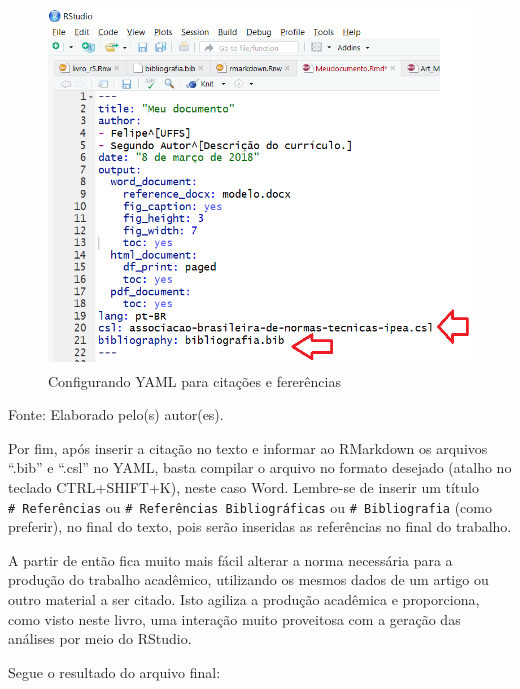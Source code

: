 \documentclass[12pt,brazil,oneside]{book}
\begin{document}
\begin{figure}[H]

{\centering \includegraphics[width=0.8\linewidth]{rmarkcitar1} 

}

\caption{Configurando YAML para citações e fererências}\label{fig:rmarkcitar1}
\end{figure}

Fonte: Elaborado pelo(s) autor(es).

Por fim, após inserir a citação no texto e informar ao RMarkdown os arquivos ``.bib'' e ``.csl'' no YAML, basta compilar o arquivo no formato desejado (atalho no teclado CTRL+SHIFT+K), neste caso Word. Lembre-se de inserir um título \texttt{\#\ Referências} ou \texttt{\#\ Referências\ Bibliográficas} ou \texttt{\#\ Bibliografia} (como preferir), no final do texto, pois serão inseridas as referências no final do trabalho.

A partir de então fica muito mais fácil alterar a norma necessária para a produção do trabalho acadêmico, utilizando os mesmos dados de um artigo ou outro material a ser citado. Isto agiliza a produção acadêmica e proporciona, como visto neste livro, uma interação muito proveitosa com a geração das análises por meio do RStudio.

Segue o resultado do arquivo final:
\end{document}
